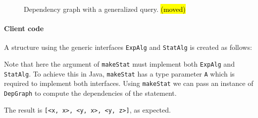 \begin{figure}[ht]
\nocaptionrule
\caption{Dependency graph with a generalized query. \hl{(moved)}}
\label{deps2}
\end{figure}

\paragraph{Client code} A structure using the generic interfaces
\lstinline{ExpAlg} and \lstinline{StatAlg} is created as follows:


\noindent Note that here the argument of
\lstinline{makeStat} must
implement both \lstinline{ExpAlg} and \lstinline{StatAlg}. To achieve
this in Java, \lstinline{makeStat} has a type parameter \lstinline{A}
which is required to implement both interfaces. Using
\lstinline{makeStat} we can pass an instance of
\lstinline{DepGraph} to compute the dependencies of the statement.


\noindent The result is \lstinline{[<x, x>, <y, x>, <y, z>]}, as expected.

